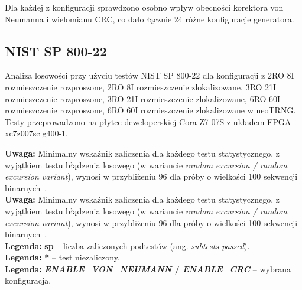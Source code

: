 Dla każdej z konfiguracji sprawdzono osobno wpływ obecności korektora von Neumanna i 
wielomianu CRC, co dało łącznie 24 różne konfiguracje generatora. 


\subsection{NIST SP 800-22}

Analiza losowości przy użyciu testów NIST SP 800-22 dla konfiguracji z 2RO 8I rozmieszczenie rozproszone, 
2RO 8I rozmieszczenie zlokalizowane, 3RO 21I rozmieszczenie rozproszone, 3RO 21I rozmieszczenie zlokalizowane, 
6RO 60I rozmieszczenie rozproszone, 
6RO 60I rozmieszczenie zlokalizowane w neoTRNG. Testy przeprowadzono na płytce deweloperskiej 
Cora Z7-07S z układem FPGA xc7z007sclg400-1.

\begin{flushleft}
\small \textbf{Uwaga:} Minimalny wskaźnik zaliczenia dla każdego testu statystycznego, 
z wyjątkiem testu błądzenia losowego 
(w wariancie \textit{random excursion / random excursion variant}), wynosi w 
przybliżeniu 96 dla próby o wielkości 100 sekwencji binarnych~\cite{NIST-SP-800-22}. \\
\small \textbf{Uwaga:} Minimalny wskaźnik zaliczenia dla każdego testu statystycznego, 
z wyjątkiem testu błądzenia losowego 
(w wariancie \textit{random excursion / random excursion variant}), wynosi w 
przybliżeniu 96 dla próby o wielkości 100 sekwencji binarnych~\cite{NIST-SP-800-22}. \\
\small \textbf{Legenda:} \textbf{sp} -- liczba zaliczonych podtestów (ang. \textit{subtests passed}). \\
\small \textbf{Legenda:} \textbf{*} -- test niezaliczony. \\
\small \textbf{Legenda:} \textbf{\textit{ENABLE\_VON\_NEUMANN} / \textit{ENABLE\_CRC}} – wybrana konfiguracja.
\end{flushleft}


